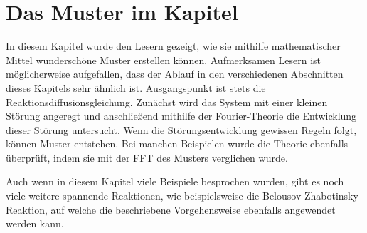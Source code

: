 %
%
%
%




\section{Das Muster im Kapitel}

In diesem Kapitel wurde den Lesern gezeigt, wie sie mithilfe mathematischer Mittel wunderschöne Muster erstellen können.
Aufmerksamen Lesern ist möglicherweise aufgefallen, dass der Ablauf in den verschiedenen Abschnitten dieses Kapitels sehr ähnlich ist.
Ausgangspunkt ist stets die Reaktionsdiffusionsgleichung.
Zunächst wird das System mit einer kleinen Störung angeregt und anschließend mithilfe der Fourier-Theorie die Entwicklung dieser Störung untersucht.
Wenn die Störungsentwicklung gewissen Regeln folgt, können Muster entstehen.
Bei manchen Beispielen wurde die Theorie ebenfalls überprüft, indem sie mit der FFT des Musters verglichen wurde.

Auch wenn in diesem Kapitel viele Beispiele besprochen wurden, gibt es noch viele weitere spannende Reaktionen, wie beispielsweise die Belousov-Zhabotinsky-Reaktion, auf welche die beschriebene Vorgehensweise ebenfalls angewendet werden kann.
